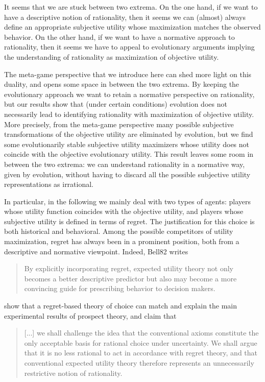 \documentclass[fleqn,reqno,11pt]{article}
\begin{document}
It seems that we are stuck between two extrema. On the one hand, if we want to have a descriptive notion of rationality, then it seems we can (almost) always define an appropriate subjective utility whose maximization matches the observed behavior. On the other hand, if we want to have a normative approach to rationality, then it seems we have to appeal to evolutionary arguments implying the understanding of rationality as maximization of objective utility.

The meta-game perspective that we introduce here can shed more light on this duality, and opens some space in between the two extrema. By keeping the evolutionary approach we want to retain a normative perspective on rationality, but our results show that (under certain conditions) evolution does not necessarily lead to identifying rationality with maximization of objective utility. More precisely, from the meta-game perspective many possible subjective transformations of the objective utility are eliminated by evolution, but we find some evolutionarily stable subjective utility maximizers whose utility does not coincide with the objective evolutionary utility. This result leaves some room in between the two extrema: we can understand rationality in a normative way, given by evolution, without having to discard all the possible subjective utility representations as irrational.

In particular, in the following we mainly deal with two types of agents: players whose utility function coincides with the objective utility, and players whose subjective utility is defined in terms of regret. The justification for this choice is both historical and behavioral. Among the possible competitors of utility maximization, regret has always been in a prominent position, both from a descriptive and normative viewpoint. Indeed, Bell82 writes 
\begin{quote}
By explicitly incorporating regret, expected utility theory not only becomes a better descriptive predictor but also may become a more convincing guide for prescribing behavior to decision makers.
\end{quote}

\citet{LoomesSugden1982:Regret-Theory:-} show that a regret-based theory of choice can match and explain the main experimental results of prospect theory, and claim that
\begin{quote}

[...] we shall challenge the idea that the conventional axioms constitute the only acceptable basis for rational choice under uncertainty. We shall argue that it is no less rational to act in accordance with regret theory, and that conventional expected utility theory therefore represents an unnecessarily restrictive notion of rationality. \cite{loosug82}

\end{quote}
\end{document}
